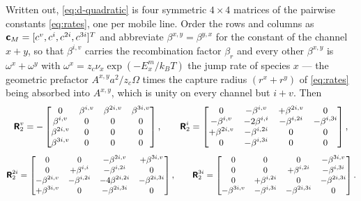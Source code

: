 Written out, \cref{eq:d-quadratic} is four symmetric $4\times4$ matrices of the
pairwise constants \cref{eq:rates}, one per mobile line. Order the rows and
columns as $\bm{\mathsf{c}}_M=[c^{v},c^{i},c^{2i},c^{3i}]^{T}$ and abbreviate
$\beta^{x,y}=\beta^{y,x}$ for the constant of the channel $x+y$, so that
$\beta^{i,v}$ carries the recombination factor $\beta_r$ and every other
$\beta^{x,y}$ is $\omega^{x}+\omega^{y}$ with $\omega^{x}=z_c\nu_x
\exp(-E^{m}_x/k_BT)$ the jump rate of species $x$ --- the geometric prefactor
$A^{x,y}a^{2}/z_c\Omega$ times the capture radius $(r^{x}+r^{y})$ of
\cref{eq:rates} being absorbed into $A^{x,y}$, which is unity on every channel
but $i\!+\!v$. Then
\begin{equation}
\small
  \bm{\mathsf{R}}_2^{v}=-\begin{bmatrix}
      0            & \beta^{i,v}  & \beta^{2i,v} & \beta^{3i,v}\\
      \beta^{i,v}  & 0            & 0            & 0\\
      \beta^{2i,v} & 0            & 0            & 0\\
      \beta^{3i,v} & 0            & 0            & 0
    \end{bmatrix},
  \qquad
  \bm{\mathsf{R}}_2^{i}=\begin{bmatrix}
      0             & -\beta^{i,v}   & +\beta^{2i,v} & 0\\
      -\beta^{i,v}  & -2\beta^{i,i}  & -\beta^{i,2i} & -\beta^{i,3i}\\
      +\beta^{2i,v} & -\beta^{i,2i}  & 0             & 0\\
      0             & -\beta^{i,3i}  & 0             & 0
    \end{bmatrix},
  \label{eq:d-R2vi}
\end{equation}
\begin{equation}
\small
  \bm{\mathsf{R}}_2^{2i}=\begin{bmatrix}
      0             & 0             & -\beta^{2i,v}   & +\beta^{3i,v}\\
      0             & +\beta^{i,i}  & -\beta^{i,2i}   & 0\\
      -\beta^{2i,v} & -\beta^{i,2i} & -4\beta^{2i,2i} & -\beta^{2i,3i}\\
      +\beta^{3i,v} & 0             & -\beta^{2i,3i}  & 0
    \end{bmatrix},
  \qquad
  \bm{\mathsf{R}}_2^{3i}=\begin{bmatrix}
      0             & 0             & 0              & -\beta^{3i,v}\\
      0             & 0             & +\beta^{i,2i}  & -\beta^{i,3i}\\
      0             & +\beta^{i,2i} & 0              & -\beta^{2i,3i}\\
      -\beta^{3i,v} & -\beta^{i,3i} & -\beta^{2i,3i} & 0
    \end{bmatrix}.
  \label{eq:d-R2cluster}
\end{equation}

